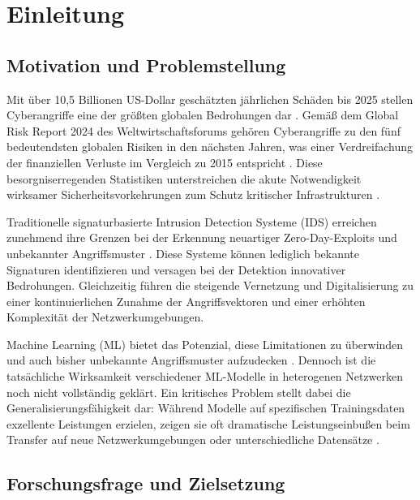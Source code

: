 \documentclass[11pt,a4paper]{article}
\begin{document}
    \setcounter{page}{1}

    \section{Einleitung}
    \subsection{Motivation und Problemstellung}

    Mit über 10,5 Billionen US-Dollar geschätzten jährlichen Schäden bis 2025 stellen Cyberangriffe eine der größten globalen Bedrohungen dar \parencite{GlobalRisksReport2024}. Gemäß dem Global Risk Report 2024 des Weltwirtschaftsforums gehören Cyberangriffe zu den fünf bedeutendsten globalen Risiken in den nächsten Jahren, was einer Verdreifachung der finanziellen Verluste im Vergleich zu 2015 entspricht \parencite{GlobalRisksReport2024}. Diese besorgniserregenden Statistiken unterstreichen die akute Notwendigkeit wirksamer Sicherheitsvorkehrungen zum Schutz kritischer Infrastrukturen \parencite{Taman2024}.

    Traditionelle signaturbasierte Intrusion Detection Systeme (IDS) erreichen zunehmend ihre Grenzen bei der Erkennung neuartiger Zero-Day-Exploits und unbekannter Angriffsmuster \parencite{Ring2019,Belavagi2016}. Diese Systeme können lediglich bekannte Signaturen identifizieren und versagen bei der Detektion innovativer Bedrohungen. Gleichzeitig führen die steigende Vernetzung und Digitalisierung zu einer kontinuierlichen Zunahme der Angriffsvektoren und einer erhöhten Komplexität der Netzwerkumgebungen.

    Machine Learning (ML) bietet das Potenzial, diese Limitationen zu überwinden und auch bisher unbekannte Angriffsmuster aufzudecken \parencite{Vinayakumar2019}. Dennoch ist die tatsächliche Wirksamkeit verschiedener ML-Modelle in heterogenen Netzwerken noch nicht vollständig geklärt. Ein kritisches Problem stellt dabei die Generalisierungsfähigkeit dar: Während Modelle auf spezifischen Trainingsdaten exzellente Leistungen erzielen, zeigen sie oft dramatische Leistungseinbußen beim Transfer auf neue Netzwerkumgebungen oder unterschiedliche Datensätze \parencite{Ring2019}.

    \subsection{Forschungsfrage und Zielsetzung}
\end{document}
